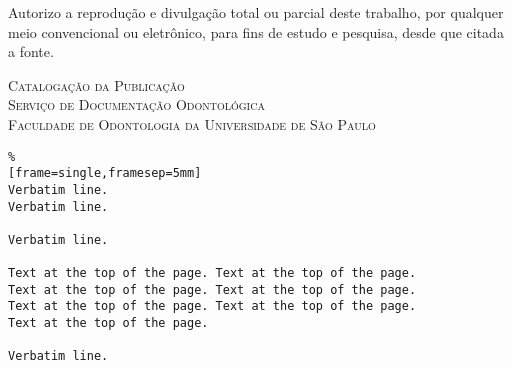 \clearpage
\thispagestyle{empty}

Autorizo a reprodução e divulgação total ou parcial
deste trabalho, por qualquer meio convencional ou
eletrônico, para fins de estudo e pesquisa, desde que
citada a fonte.

\vspace{2.5cm} %

\begin{center}
\textsc{\large 
Catalogação da Publicação \\
Serviço de Documentação Odontológica \\
Faculdade de Odontologia da Universidade de São Paulo}\\[0.5cm]
\end{center}

\vfill

\begin{Verbatim}%
[frame=single,framesep=5mm]
Verbatim line.
Verbatim line.

Verbatim line.

Text at the top of the page. Text at the top of the page. 
Text at the top of the page. Text at the top of the page. 
Text at the top of the page. Text at the top of the page.
Text at the top of the page.

Verbatim line.
\end{Verbatim}
